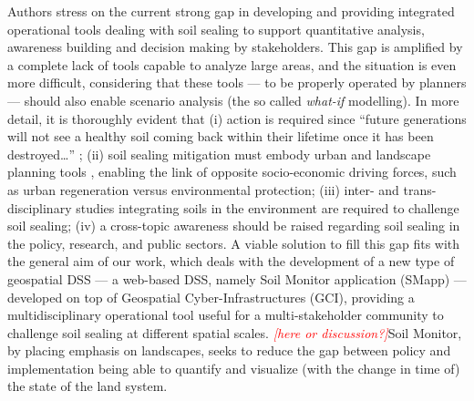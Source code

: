 \documentclass[APA,LATO1COL,doublespace]{WileyNJD-v2}
\newcommand{\toberevised}[1]{\emph{\textcolor{red}{#1}}} %
\newcommand{\reviewer}[1]{\emph{\textcolor{cyan}{#1}}}   %
\begin{document}
Authors stress on the current
strong gap in developing and providing integrated operational tools 
dealing with soil sealing 
to support quantitative analysis, awareness building and decision making by stakeholders.
This gap is amplified by a complete lack of tools 
capable to analyze large areas, and the situation is even more difficult, considering that these tools --- to be properly operated by planners --- should also enable scenario analysis (the so called \textit{what-if} modelling).
In more detail, it is thoroughly evident that 
(i) action is required since ``future generations will not see a healthy soil coming back within their lifetime once it has been destroyed\dots'' \citep{SWD12}; 
(ii) soil sealing mitigation must embody urban and landscape planning tools \citep{Artmann14}, enabling the link of opposite socio-economic driving forces, such as urban regeneration versus environmental protection; 
(iii) inter- and trans-disciplinary studies integrating soils in the environment are required to challenge soil sealing;
(iv) a cross-topic awareness should be raised regarding soil sealing in the policy, research, and public sectors.
A viable solution to fill this gap fits with the general aim of our work, which deals with the development of
a new type of geospatial DSS --- a web-based DSS, namely Soil Monitor application (SMapp) --- developed on top of Geospatial Cyber-Infrastructures (GCI), providing a multidisciplinary operational tool useful for a multi-stakeholder community to challenge soil sealing at different spatial scales.
\toberevised{[here or discussion?]\;}Soil Monitor, by placing emphasis on landscapes, seeks to reduce the gap between policy and implementation being able to quantify and visualize (with the change in time of) the state of the land system.

\end{document}
